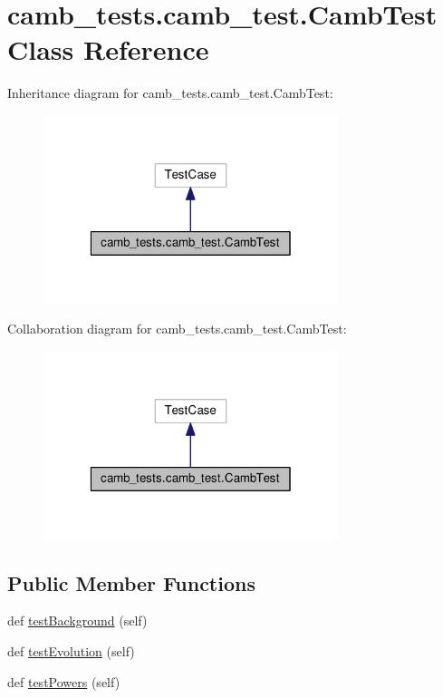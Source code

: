 \hypertarget{classcamb__tests_1_1camb__test_1_1CambTest}{}\section{camb\+\_\+tests.\+camb\+\_\+test.\+Camb\+Test Class Reference}
\label{classcamb__tests_1_1camb__test_1_1CambTest}


Inheritance diagram for camb\+\_\+tests.\+camb\+\_\+test.\+Camb\+Test\+:
\nopagebreak
\begin{figure}[H]
\begin{center}
\leavevmode
\includegraphics[width=244pt]{classcamb__tests_1_1camb__test_1_1CambTest__inherit__graph}
\end{center}
\end{figure}


Collaboration diagram for camb\+\_\+tests.\+camb\+\_\+test.\+Camb\+Test\+:
\nopagebreak
\begin{figure}[H]
\begin{center}
\leavevmode
\includegraphics[width=244pt]{classcamb__tests_1_1camb__test_1_1CambTest__coll__graph}
\end{center}
\end{figure}
\subsection*{Public Member Functions}
\begin{DoxyCompactItemize}
\item 
def \mbox{\hyperlink{classcamb__tests_1_1camb__test_1_1CambTest_a33ac5291dc1a81c3a9560edd360209a2}{test\+Background}} (self)
\item 
def \mbox{\hyperlink{classcamb__tests_1_1camb__test_1_1CambTest_a6ecf08f89e010244d33f12e96797a5eb}{test\+Evolution}} (self)
\item 
def \mbox{\hyperlink{classcamb__tests_1_1camb__test_1_1CambTest_ad36d20c38d0a03694cce1b45de9bb6f7}{test\+Powers}} (self)
\end{DoxyCompactItemize}


